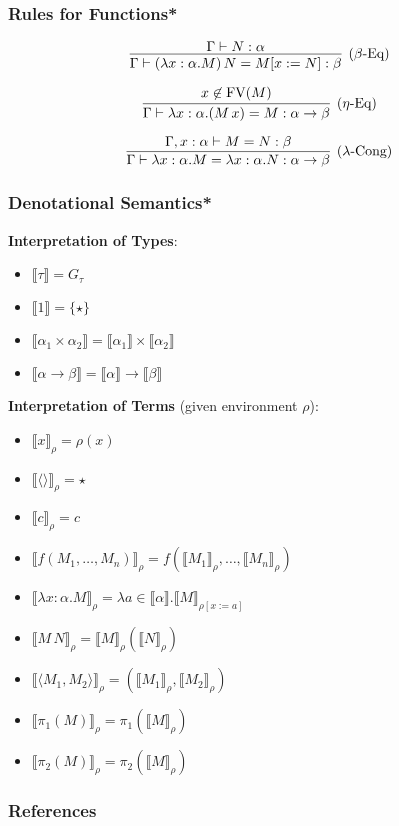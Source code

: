 \documentclass[aspectratio=169]{beamer}
\begin{document}
\begin{frame}
\frametitle{Rules for Functions*}

\[
\infer[\text{($\beta$-Eq)}]{\Gamma \vdash (\lambda x : \alpha. M) \, N = M[x := N] : \beta}{\Gamma \vdash N : \alpha}
\]

\[
\infer[\text{($\eta$-Eq)}]{\Gamma \vdash \lambda x : \alpha. (M \, x) = M : \alpha \rightarrow \beta}{x \not\in \text{FV}(M)}
\]

\[
\infer[\text{($\lambda$-Cong)}]{\Gamma \vdash \lambda x : \alpha. M = \lambda x : \alpha. N : \alpha \rightarrow \beta}{\Gamma, x : \alpha \vdash M = N : \beta}
\]

\end{frame}

\begin{frame}
\frametitle{Denotational Semantics*}

\textbf{Interpretation of Types}:

\begin{itemize}
    \item $\llbracket \tau \rrbracket = G_\tau$
    \item $\llbracket 1 \rrbracket = \{\star\}$
    \item $\llbracket \alpha_1 \times \alpha_2 \rrbracket = \llbracket \alpha_1 \rrbracket \times \llbracket \alpha_2 \rrbracket$
    \item $\llbracket \alpha \rightarrow \beta \rrbracket = \llbracket \alpha \rrbracket \rightarrow \llbracket \beta \rrbracket$
\end{itemize}

\textbf{Interpretation of Terms} (given environment $\rho$):
\begin{itemize}
    \item $\llbracket x \rrbracket_\rho = \rho(x)$
    \item $\llbracket \langle \rangle \rrbracket_\rho = \star$
    \item $\llbracket c \rrbracket_\rho = c$
    \item $\llbracket f(M_1, \ldots, M_n) \rrbracket_\rho = f(\llbracket M_1 \rrbracket_\rho, \ldots, \llbracket M_n \rrbracket_\rho)$
    \item $\llbracket \lambda x : \alpha. M \rrbracket_\rho = \lambda a \in \llbracket \alpha \rrbracket. \llbracket M \rrbracket_{\rho[x := a]}$
    \item $\llbracket M \, N \rrbracket_\rho = \llbracket M \rrbracket_\rho (\llbracket N \rrbracket_\rho)$
    \item $\llbracket \langle M_1, M_2 \rangle \rrbracket_\rho = (\llbracket M_1 \rrbracket_\rho, \llbracket M_2 \rrbracket_\rho)$
    \item $\llbracket \pi_1(M) \rrbracket_\rho = \pi_1(\llbracket M \rrbracket_\rho)$
    \item $\llbracket \pi_2(M) \rrbracket_\rho = \pi_2(\llbracket M \rrbracket_\rho)$
\end{itemize}
\end{frame}


\begin{frame}
\frametitle{References}

\printbibliography
\end{frame}
\end{document}
